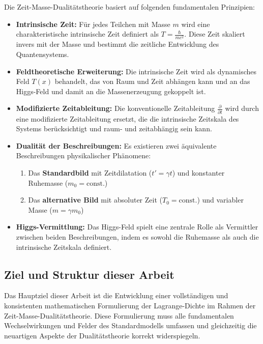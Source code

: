 \documentclass{article}
\theoremstyle{definition}
\theoremstyle{remark}
\newcommand{\Tfield}{T(x)} %
\begin{document}
		Die Zeit-Masse-Dualitätstheorie basiert auf folgenden fundamentalen Prinzipien:
		
		\begin{itemize}
			\item \textbf{Intrinsische Zeit:} Für jedes Teilchen mit Masse $m$ wird eine charakteristische intrinsische Zeit definiert als $T = \frac{\hbar}{mc^2}$. Diese Zeit skaliert invers mit der Masse und bestimmt die zeitliche Entwicklung des Quantensystems.
			
			\item \textbf{Feldtheoretische Erweiterung:} Die intrinsische Zeit wird als dynamisches Feld $\Tfield$ behandelt, das von Raum und Zeit abhängen kann und an das Higgs-Feld und damit an die Massenerzeugung gekoppelt ist.
			
			\item \textbf{Modifizierte Zeitableitung:} Die konventionelle Zeitableitung $\frac{\partial}{\partial t}$ wird durch eine modifizierte Zeitableitung ersetzt, die die intrinsische Zeitskala des Systems berücksichtigt und raum- und zeitabhängig sein kann.
			
			\item \textbf{Dualität der Beschreibungen:} Es existieren zwei äquivalente Beschreibungen physikalischer Phänomene:
			\begin{enumerate}
				\item Das \textbf{Standardbild} mit Zeitdilatation ($t' = \gamma t$) und konstanter Ruhemasse ($m_0 = \text{const.}$)
				\item Das \textbf{alternative Bild} mit absoluter Zeit ($T_0 = \text{const.}$) und variabler Masse ($m = \gamma m_0$)
			\end{enumerate}
			
			\item \textbf{Higgs-Vermittlung:} Das Higgs-Feld spielt eine zentrale Rolle als Vermittler zwischen beiden Beschreibungen, indem es sowohl die Ruhemasse als auch die intrinsische Zeitskala definiert.
		\end{itemize}
		
		\subsection{Ziel und Struktur dieser Arbeit}
		
		Das Hauptziel dieser Arbeit ist die Entwicklung einer vollständigen und konsistenten mathematischen Formulierung der Lagrange-Dichte im Rahmen der Zeit-Masse-Dualitätstheorie. Diese Formulierung muss alle fundamentalen Wechselwirkungen und Felder des Standardmodells umfassen und gleichzeitig die neuartigen Aspekte der Dualitätstheorie korrekt widerspiegeln.
		
\end{document}
